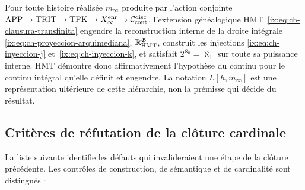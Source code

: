 \begin{theorem}
\label{ix:thm:decision-continuo-hmt}
Pour toute histoire réalisée
\(m_\infty\) produite par l’action conjointe
\(\mathrm{APP}\to\mathrm{TRIT}\to\mathrm{TPK}\to
X_\infty^{\rm enr}\to\mathcal C_{\rm cont}^{\rm disc}\), l’extension
généalogique HMT~\eqref{ix:eq:ch-clausura-transfinita} engendre la reconstruction interne de la droite intégrale
\eqref{ix:eq:ch-proyeccion-arquimediana}, \(\mathbb R_{\rm HMT}^{\mathfrak G}\), construit les injections
\eqref{ix:eq:ch-inyeccion-j} et~\eqref{ix:eq:ch-inyeccion-k}, et satisfait
\(2^{\aleph_0}=\aleph_1\) sur toute sa puissance interne. HMT
démontre donc affirmativement l’hypothèse du continu pour le continu
intégral qu’elle définit et engendre. La notation \(L[h,m_\infty]\) est une
représentation ultérieure de cette hiérarchie, non la prémisse qui décide du
résultat.
\end{theorem}


\subsection{Critères de réfutation de la clôture cardinale}

La liste suivante identifie les défauts qui invalideraient une étape de la clôture
précédente. Les contrôles de construction, de sémantique et de
cardinalité sont distingués :

